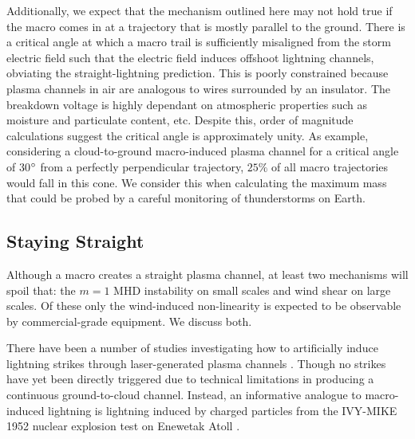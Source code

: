 \documentclass[%
reprint,
 amsmath,amssymb,
 aps,
 prd,
]{revtex4-2}
\begin{document}
        Additionally, we expect that the mechanism outlined here may not hold true if the macro comes in at a trajectory that is mostly parallel to the ground. There is a critical angle at which a macro trail is sufficiently misaligned from the storm electric field such that the electric field induces offshoot lightning channels, obviating the straight-lightning prediction. This is poorly constrained because plasma channels in air are analogous to wires surrounded by an insulator. The breakdown voltage is highly dependant on atmospheric properties such as moisture and particulate content, etc. Despite this, order of magnitude calculations suggest the critical angle is approximately unity. As example, considering a cloud-to-ground macro-induced plasma channel for a critical angle of 30$\degree$ from a perfectly perpendicular trajectory, $25\%$ of all macro trajectories would fall in this cone. We consider this when calculating the maximum mass that could be probed by a careful monitoring of thunderstorms on Earth.



    \subsection{Staying Straight} %
    \label{sub:staying_straight}

        Although a macro creates a straight plasma channel, at least two mechanisms will spoil that: the $m=1$ MHD instability on small scales and wind shear on large scales. Of these only the wind-induced non-linearity is expected to be observable by commercial-grade equipment. We discuss both.

        There have been a number of studies investigating how to artificially induce lightning strikes through laser-generated plasma channels \citep[see][]{Kasparian2008}. Though no strikes have yet been directly triggered due to technical limitations in producing a continuous ground-to-cloud channel. Instead, an informative analogue to macro-induced lightning is lightning induced by charged particles from the IVY-MIKE 1952 nuclear explosion test on Enewetak Atoll \citep{IVY-MIKE1987}. 
\end{document}
